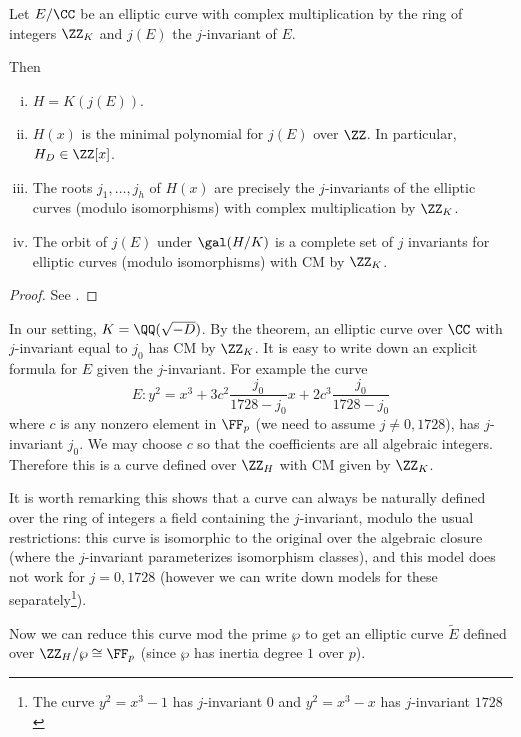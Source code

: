 \documentclass[11pt]{article}
\begin{document}
\begin{description}
\begin{thm}
		Let $E/\CC$ be an elliptic curve with complex multiplication by the ring of integers $\ZZ_K$ and $j(E)$ the $j$-invariant of $E$.
		
		Then
		\begin{enumerate}[(i)]
			\item $H = K(j(E))$.
			\item $H(x)$ is the minimal polynomial for $j(E)$ over $\ZZ$. In particular, $H_D\in \ZZ[x]$.
			\item The roots $j_1,\dots,j_h$ of $H(x)$ are precisely the $j$-invariants of the elliptic curves (modulo isomorphisms) with complex multiplication by $\ZZ_K$.
			\item The orbit of $j(E)$ under $\gal(H/K)$ is a complete set of $j$ invariants for elliptic curves (modulo isomorphisms) with CM by $\ZZ_K$.
		\end{enumerate}
	\end{thm}
	\begin{proof}
		See \cite[Thm.~II.4.1, Pg.~121]{silverman1994advanced}.
	\end{proof}
	
	In our setting, $K = \QQ(\sqrt{-D})$. By the theorem, an elliptic curve over $\CC$ with $j$-invariant equal to $j_0$ has CM by $\ZZ_K$. It is easy to write down an explicit formula for $E$ given the $j$-invariant. For example the curve
	$$
	E:  y^2 = x^3 + 3c^2\frac{j_0}{1728 - j_0}x + 2c^3\frac{j_0}{1728 - j_0}
	$$
	where $c$ is any nonzero element in $\FF_p$ (we need to assume $j\neq 0,1728$), has $j$-invariant $j_0$. We may choose $c$ so that the coefficients are all algebraic integers. Therefore this is a curve defined over $\ZZ_H$ with CM given by $\ZZ_K$.
	
	\begin{rem}
		It is worth remarking this shows that a curve can always be naturally defined over the ring of integers a field containing the $j$-invariant, modulo the usual restrictions: this curve is isomorphic to the original over the algebraic closure (where the $j$-invariant parameterizes isomorphism classes), and this model does not work for $j=0,1728$ (however we can write down models for these separately\footnote{The curve $y^2 = x^3 - 1$ has $j$-invariant $0$ and $y^2 = x^3 - x$ has $j$-invariant $1728$}).
	\end{rem}
	
	Now we can reduce this curve mod the prime $\wp$ to get an elliptic curve $\tilde{E}$ defined over $\ZZ_H/\wp \cong \FF_p$ (since $\wp$ has inertia degree $1$ over $p$).
	

\end{description}
\end{document}

